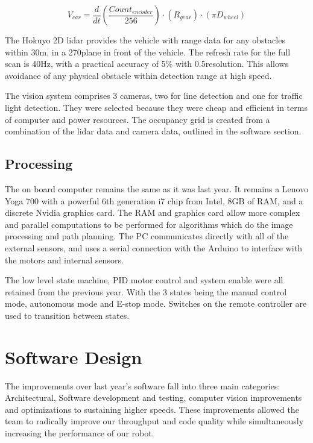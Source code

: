 \documentclass[11pt,journal]{IEEEtran}
\begin{document}
\begin{equation}
    V_{car} = \frac{d}{dt}(\frac{Count_{encoder}}{256})\cdot(R_{gear})\cdot(\pi D_{wheel})
\end{equation}

The Hokuyo 2D lidar provides the vehicle with range data for any obstacles within 30m, in a 270\degree plane in front of the vehicle. The refresh rate for the full scan is 40Hz, with a practical accuracy of 5\% with 0.5\degree resolution. This allows avoidance of any physical obstacle within detection range at high speed.

The vision system comprises 3 cameras, two for line detection and one for traffic light detection. They were selected because they were cheap and efficient in terms of computer and power resources. The occupancy grid is created from a combination of the lidar data and camera data, outlined in the software section.


\subsection{Processing}

The on board computer remains the same as it was last year. It remains a Lenovo Yoga 700 with a powerful 6th generation i7 chip from Intel, 8GB of RAM, and a discrete Nvidia graphics card. The RAM and graphics card allow more complex and parallel computations to be performed for algorithms which do the image processing and path planning. The PC communicates directly with all of the external sensors, and uses a serial connection with the Arduino to interface with the motors and internal sensors.

The low level state machine, PID motor control and system enable were all retained from the previous year. With the 3 states being the manual control mode, autonomous mode and E-stop mode. Switches on the remote controller are used to transition between states.

\section{Software Design}
 
The improvements over last year's software fall into three main categories: Architectural, Software development and testing, computer vision improvements and optimizations to sustaining higher speeds. These improvements allowed the team to radically improve our throughput and code quality while simultaneously increasing the performance of our robot.
\end{document}
